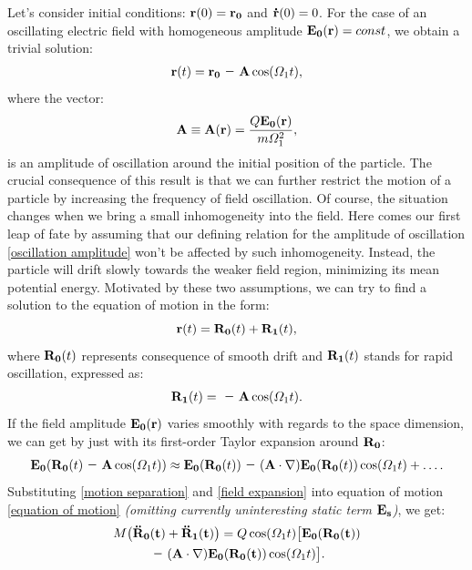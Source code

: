Let's consider initial conditions: $\vb{r}(0) = \vb{r_0}$ and $\vb{\dot{r}}(0) = 0$. For the case of an oscillating electric field with homogeneous amplitude $\vb{E_0}(\vb{r}) = const$, we obtain a trivial solution:
\begin{equation}
	\label{solution for homogenious field}
	\vb{r}(t) = \vb{r_0} \minus \vb{A} \cos(\Omega_1 t),
\end{equation}
where the vector: 
\begin{equation}
	\label{oscillation amplitude}
	\vb{A} \equiv \vb{A}(\vb{r}) = \frac{Q \vb{E_0}(\vb{r})}{m \Omega_1^2},
\end{equation}
is an amplitude of oscillation around the initial position of the particle. The crucial consequence of this result is that we can further restrict the motion of a particle by increasing the frequency of field oscillation. Of course, the situation changes when we bring a small inhomogeneity into the field. Here comes our first leap of fate by assuming that our defining relation for the amplitude of oscillation \eqref{oscillation amplitude} won't be affected by such inhomogeneity. Instead, the particle will drift slowly towards the weaker field region, minimizing its mean potential energy. Motivated by these two assumptions, we can try to find a solution to the equation of motion in the form:
\begin{equation}
	\label{motion separation}
	\vb{r}(t) = \vb{R_0}(t) + \vb{R_1}(t),
\end{equation}
where $\vb{R_0}(t)$ represents consequence of smooth drift and $\vb{R_1}(t)$ stands for rapid oscillation, expressed as:
\begin{equation}
	\label{oscillation motion}
	\vb{R_1}(t) = \minus \vb{A} \cos(\Omega_1 t).
\end{equation}
If the field amplitude $\vb{E_0}(\vb{r})$ varies smoothly with regards to the space dimension, we can get by just with its first-order Taylor expansion around $\vb{R_0}$:
\begin{equation}
	\label{field expansion}
	\vb{E_0}(\vb{R_0}(t) \minus \vb{A} \cos(\Omega_1 t)) \approx \vb{E_0}(\vb{R_0}(t)) \minus(\vb{A} \cdot \nabla) \vb{E_0}(\vb{R_0}(t)) \cos(\Omega_1 t) + \dots.
\end{equation}
Substituting \eqref{motion separation} and \eqref{field expansion} into equation of motion \eqref{equation of motion} \textit{(omitting currently uninteresting static term $\vb{E_s}$)}, we get:
\begin{multline}
	M \big( \vb{\ddot{R}_0(t)} + \vb{\ddot{R}_1(t)} \big) = Q \cos(\Omega_1 t) \big[ \vb{E_0(\vb{R_0}(t))} \\ \minus (\vb{A} \cdot \nabla) \vb{E_0(\vb{R_0}(t))} \cos(\Omega_1 t)  \big].
\end{multline}
